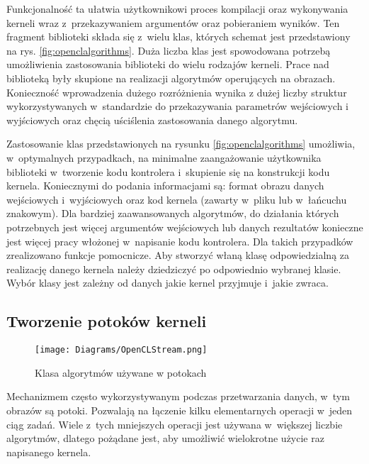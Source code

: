 Funkcjonalność ta ułatwia użytkownikowi proces kompilacji oraz wykonywania kerneli wraz z~przekazywaniem argumentów oraz pobieraniem wyników. Ten fragment biblioteki składa się z~wielu klas, których schemat jest przedstawiony na rys. \ref{fig:openclalgorithms}. Duża liczba klas jest spowodowana potrzebą umożliwienia zastosowania biblioteki do wielu rodzajów kerneli. Prace nad biblioteką były skupione na realizacji algorytmów operujących na obrazach. Konieczność wprowadzenia dużego rozróżnienia wynika z dużej liczby struktur wykorzystywanych w~standardzie do przekazywania parametrów wejściowych i wyjściowych oraz chęcią uściślenia zastosowania danego algorytmu.

Zastosowanie klas przedstawionych na rysunku \ref{fig:openclalgorithms} umożliwia, w~optymalnych przypadkach, na minimalne zaangażowanie użytkownika biblioteki w~tworzenie kodu kontrolera i~skupienie się na konstrukcji kodu kernela. Koniecznymi do podania informacjami są: format obrazu danych wejściowych i~wyjściowych oraz kod kernela (zawarty w~pliku lub w~łańcuchu znakowym). Dla bardziej zaawansowanych algorytmów, do działania których potrzebnych jest więcej argumentów wejściowych lub danych rezultatów konieczne jest więcej pracy włożonej w~napisanie kodu kontrolera. Dla takich przypadków zrealizowano funkcje pomocnicze. Aby stworzyć właną klasę odpowiedzialną za realizację danego kernela należy dziedziczyć po odpowiednio wybranej klasie. Wybór klasy jest zależny od danych jakie kernel przyjmuje i~jakie zwraca.

\subsection{Tworzenie potoków kerneli}
\label{subsec:potokikerneli}

\begin{figure}
\begin{center}
\texttt{[image: Diagrams/OpenCLStream.png]}
\end{center}
\caption{Klasa algorytmów używane w potokach}
\label{fig:diagrampotok}
\end{figure}

Mechanizmem często wykorzystywanym podczas przetwarzania danych, w~tym obrazów są potoki. Pozwalają na łączenie kilku elementarnych operacji w~jeden ciąg zadań. Wiele z~tych mniejszych operacji jest używana w~większej liczbie algorytmów, dlatego pożądane jest, aby umożliwić wielokrotne użycie raz napisanego kernela.

